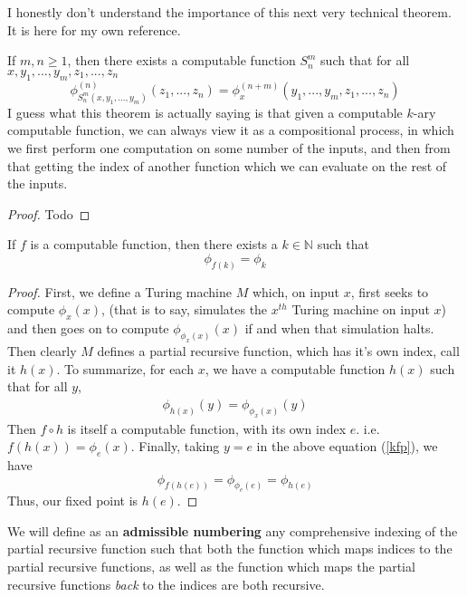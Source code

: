 I honestly don't understand the importance of this next very technical theorem. It is here for my own reference.
\begin{theorem}
    If $m,n \geq 1$, then there exists a computable function $S_n^m$ such that for all $x,y_1,...,y_m,z_1,...,z_n$
    \[ \phi_{S_n^m(x,y_1,...,y_m)}^{(n)}(z_1,...,z_n) = \phi_x^{(n+m)}(y_1,...,y_m,z_1,...,z_n) \]
    I guess what this theorem is actually saying is that given a computable $k$-ary computable function, we can always view it as a compositional process, in which we first perform one computation on some number of the inputs, and then from that getting the index of another function which we can evaluate on the rest of the inputs.
\end{theorem}
\begin{proof}
 Todo
\end{proof}
\begin{theorem}
    If $f$ is a computable function, then there exists a $k \in \mathbb{N}$ such that 
    \[ \phi_{f(k)} = \phi_k \]
\end{theorem}
\begin{proof}
    First, we define a Turing machine $M$ which, on input $x$, first seeks to compute $\phi_x(x)$, (that is to say, simulates the $x^{th}$ Turing machine on input $x$) and then goes on to compute $\phi_{\phi_x(x)}(x)$ if and when that simulation halts. Then clearly $M$ defines a partial recursive function, which has it's own index, call it $h(x)$. To summarize, for each $x$, we have a computable function $h(x)$ such that for all $y$,
    \begin{align}
        \phi_{h(x)}(y) = \phi_{\phi_x(x)}(y) \label{kfp}
    \end{align}
    Then $f \circ h$ is itself a computable function, with its own index $e$. i.e. $f(h(x)) = \phi_e(x)$. Finally, taking $y = e$ in the above equation (\ref{kfp}), we have 
    \[ \phi_{f(h(e))} = \phi_{\phi_e(e)} = \phi_{h(e)} \]
    Thus, our fixed point is $h(e)$.
\end{proof}
\par We will define as an \textbf{admissible numbering} any comprehensive indexing of the partial recursive function such that both the function which maps indices to the partial recursive functions, as well as the function which maps the partial recursive functions \textit{back} to the indices are both recursive. 

